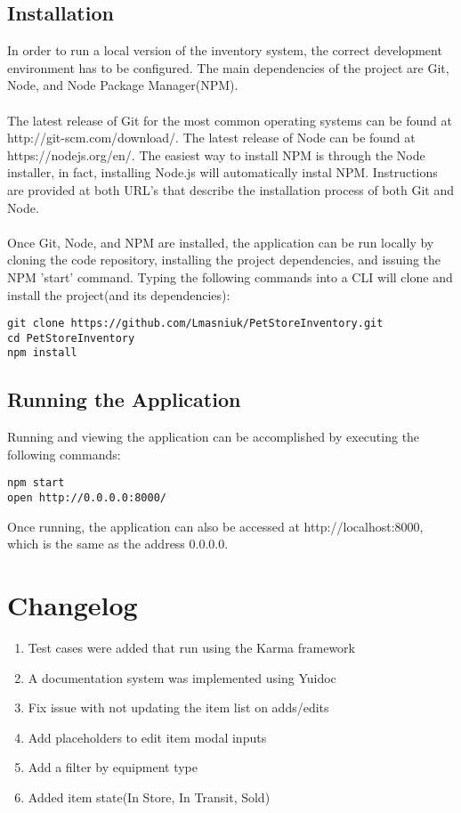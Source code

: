 \documentclass[letterpaper, 12pt]{article}
\begin{document}
\subsection{Installation}
\noindent In order to run a local version of the inventory system, the correct development environment has to be configured. The main dependencies of the project are Git, Node, and Node Package Manager(NPM).
\\\\
The latest release of Git for the most common operating systems can be found at http://git-scm.com/download/. The latest release of Node can be found at https://nodejs.org/en/. The easiest way to install NPM is through the Node installer, in fact, installing Node.js will automatically instal NPM. Instructions are provided at both URL's that describe the installation process of both Git and Node. 
\\\\
Once Git, Node, and NPM are installed, the application can be run locally by cloning the code repository, installing the project dependencies, and issuing the NPM 'start' command. 
Typing the following commands into a CLI will clone and install the project(and its dependencies):
\begin{verbatim}
git clone https://github.com/Lmasniuk/PetStoreInventory.git
cd PetStoreInventory
npm install
\end{verbatim}



\subsection{Running the Application}
\noindent Running and viewing the application can be accomplished by executing the following commands:
\begin{verbatim}
npm start
open http://0.0.0.0:8000/
\end{verbatim}
Once running, the application can also be accessed at http://localhost:8000, which is the same as the address 0.0.0.0.


\section{Changelog}
\begin{enumerate}
\item Test cases were added that run using the Karma framework
\item A documentation system was implemented using Yuidoc
\item Fix issue with not updating the item list on adds/edits
\item Add placeholders to edit item modal inputs
\item Add a filter by equipment type
\item Added item state(In Store, In Transit, Sold)
\end{enumerate}
\end{document}
